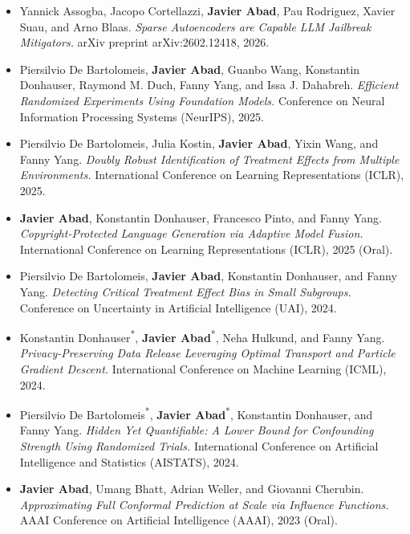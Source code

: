 
{\small
\begin{itemize}[leftmargin=*, itemsep=0.25em, topsep=0.35em]
  \item Yannick Assogba, Jacopo Cortellazzi, \textbf{Javier Abad}, Pau Rodriguez, Xavier Suau, and Arno Blaas. \emph{Sparse Autoencoders are Capable LLM Jailbreak Mitigators.} arXiv preprint arXiv:2602.12418, 2026.
  \item Piersilvio De Bartolomeis, \textbf{Javier Abad}, Guanbo Wang, Konstantin Donhauser, Raymond M. Duch, Fanny Yang, and Issa J. Dahabreh. \emph{Efficient Randomized Experiments Using Foundation Models.} Conference on Neural Information Processing Systems (NeurIPS), 2025.
  \item Piersilvio De Bartolomeis, Julia Kostin, \textbf{Javier Abad}, Yixin Wang, and Fanny Yang. \emph{Doubly Robust Identification of Treatment Effects from Multiple Environments.} International Conference on Learning Representations (ICLR), 2025.
  \item \textbf{Javier Abad}, Konstantin Donhauser, Francesco Pinto, and Fanny Yang. \emph{Copyright-Protected Language Generation via Adaptive Model Fusion.} International Conference on Learning Representations (ICLR), 2025 (Oral).
  \item Piersilvio De Bartolomeis, \textbf{Javier Abad}, Konstantin Donhauser, and Fanny Yang. \emph{Detecting Critical Treatment Effect Bias in Small Subgroups.} Conference on Uncertainty in Artificial Intelligence (UAI), 2024.
  \item Konstantin Donhauser\textsuperscript{*}, \textbf{Javier Abad}\textsuperscript{*}, Neha Hulkund, and Fanny Yang. \emph{Privacy-Preserving Data Release Leveraging Optimal Transport and Particle Gradient Descent.} International Conference on Machine Learning (ICML), 2024.
  \item Piersilvio De Bartolomeis\textsuperscript{*}, \textbf{Javier Abad}\textsuperscript{*}, Konstantin Donhauser, and Fanny Yang. \emph{Hidden Yet Quantifiable: A Lower Bound for Confounding Strength Using Randomized Trials.} International Conference on Artificial Intelligence and Statistics (AISTATS), 2024.
  \item \textbf{Javier Abad}, Umang Bhatt, Adrian Weller, and Giovanni Cherubin. \emph{Approximating Full Conformal Prediction at Scale via Influence Functions.} AAAI Conference on Artificial Intelligence (AAAI), 2023 (Oral).
\end{itemize}}

